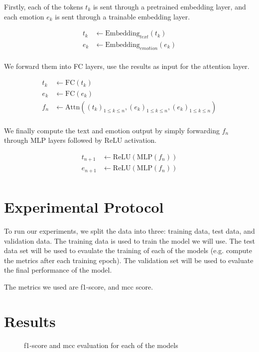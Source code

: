 \documentclass[oneside, a4paper, onecolumn, 11pt]{article}
\begin{document}
Firstly, each of the tokens $t_k$ is sent through a pretrained embedding layer, and each emotion $e_k$ is sent through a trainable embedding layer.

\begin{align*}
  t_k &\leftarrow \text{Embedding}_{text}(t_k) \\
  e_k &\leftarrow \text{Embedding}_{emotion}(e_k) \\
\end{align*}

We forward them into FC layers, use the results as input for the attention layer.

\begin{align*}
  t_k &\leftarrow \text{FC}(t_k) \\
  e_k &\leftarrow \text{FC}(e_k) \\
  f_n &\leftarrow \text{Attn}((t_k)_{1\leq k\leq n},(e_k)_{1\leq k\leq n},(e_k)_{1\leq k\leq n}) \\
\end{align*}

We finally compute the text and emotion output by simply forwarding $f_n$ through MLP layers followed by ReLU activation.

\begin{align*}
  t_{n+1} &\leftarrow \text{ReLU}(\text{MLP}(f_n)) \\
  e_{n+1} &\leftarrow \text{ReLU}(\text{MLP}(f_n)) \\
\end{align*}



\section{Experimental Protocol}

To run our experiments, we split the data into three: training data, test data, and validation data. The training data is used to train the 
model we will use. The test data set will be used to evaulate the training of each of the models (e.g. compute the metrics after each training
epoch). The validation set will be used to evaluate the final performance of the model.

The metrics we used are f1-score, and mcc score.

\section{Results}
\begin{figure}[ht]
  \begin{center}
  
  \caption{f1-score and mcc evaluation for each of the models}
\end{center}
\end{figure}
\end{document}
